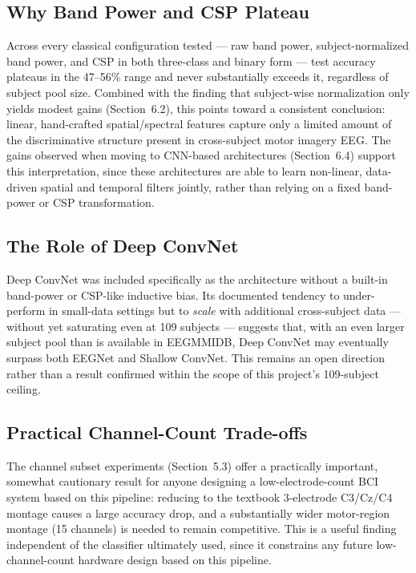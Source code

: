 \documentclass[11pt,a4paper]{article}
\begin{document}
\subsection{Why Band Power and CSP Plateau}
Across every classical configuration tested --- raw band power, subject-normalized band power, and CSP in both three-class and binary form --- test accuracy plateaus in the 47--56\% range and never substantially exceeds it, regardless of subject pool size. Combined with the finding that subject-wise normalization only yields modest gains (Section~6.2), this points toward a consistent conclusion: linear, hand-crafted spatial/spectral features capture only a limited amount of the discriminative structure present in cross-subject motor imagery EEG. The gains observed when moving to CNN-based architectures (Section~6.4) support this interpretation, since these architectures are able to learn non-linear, data-driven spatial and temporal filters jointly, rather than relying on a fixed band-power or CSP transformation.

\subsection{The Role of Deep ConvNet}
Deep ConvNet was included specifically as the architecture without a built-in band-power or CSP-like inductive bias. Its documented tendency to under-perform in small-data settings but to \emph{scale} with additional cross-subject data --- without yet saturating even at 109 subjects --- suggests that, with an even larger subject pool than is available in EEGMMIDB, Deep ConvNet may eventually surpass both EEGNet and Shallow ConvNet. This remains an open direction rather than a result confirmed within the scope of this project's 109-subject ceiling.

\subsection{Practical Channel-Count Trade-offs}
The channel subset experiments (Section~5.3) offer a practically important, somewhat cautionary result for anyone designing a low-electrode-count BCI system based on this pipeline: reducing to the textbook 3-electrode C3/Cz/C4 montage causes a large accuracy drop, and a substantially wider motor-region montage (15 channels) is needed to remain competitive. This is a useful finding independent of the classifier ultimately used, since it constrains any future low-channel-count hardware design based on this pipeline.
\end{document}
